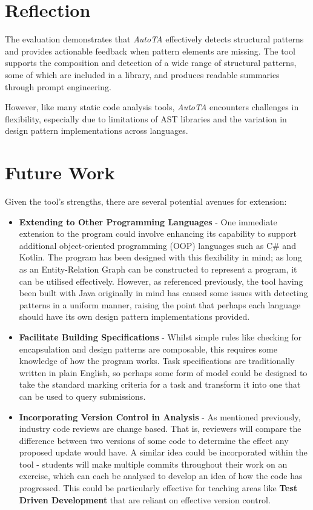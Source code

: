 \label{chapter:conclusion}
\section{Reflection}

The evaluation demonstrates that \emph{AutoTA} effectively detects structural patterns and provides actionable feedback when pattern elements are missing. The tool supports the composition and detection of a wide range of structural patterns, some of which are included in a library, and produces readable summaries through prompt engineering. 

However, like many static code analysis tools, \emph{AutoTA} encounters challenges in flexibility, especially due to limitations of AST libraries and the variation in design pattern implementations across languages.

\section{Future Work}
Given the tool's strengths, there are several potential avenues for extension:
\begin{itemize}
    \item \textbf{Extending to Other Programming Languages} - One immediate extension to the program could involve enhancing its capability to support additional object-oriented programming (OOP) languages such as C\# and Kotlin. The program has been designed with this flexibility in mind; as long as an Entity-Relation Graph can be constructed to represent a program, it can be utilised effectively. However, as referenced previously, the tool having been built with Java originally in mind has caused some issues with detecting patterns in a uniform manner, raising the point that perhaps each language should have its own design pattern implementations provided.
    \item \textbf{Facilitate Building Specifications} - Whilst simple rules like checking for encapsulation and design patterns are composable, this requires some knowledge of how the program works. Task specifications are traditionally written in plain English, so perhaps some form of model could be designed to take the standard marking criteria for a task and transform it into one that can be used to query submissions.
    \item \textbf{Incorporating Version Control in Analysis} - As mentioned previously, industry code reviews are change based. That is, reviewers will compare the difference between two versions of some code to determine the effect any proposed update would have. A similar idea could be incorporated within the tool - students will make multiple commits throughout their work on an exercise, which can each be analysed to develop an idea of how the code has progressed. This could be particularly effective for teaching areas like \textbf{Test Driven Development} that are reliant on effective version control.
\end{itemize}


 
